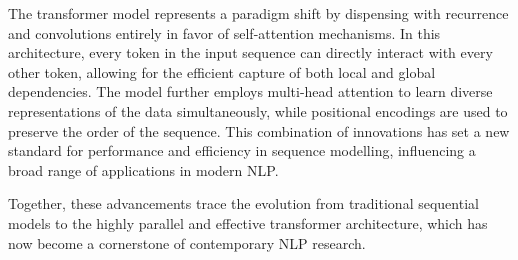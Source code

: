 The transformer model represents a paradigm shift by dispensing with recurrence and convolutions entirely in favor of self-attention mechanisms. In this architecture, every token in the input sequence can directly interact with every other token, allowing for the efficient capture of both local and global dependencies. The model further employs multi-head attention to learn diverse representations of the data simultaneously, while positional encodings are used to preserve the order of the sequence. This combination of innovations has set a new standard for performance and efficiency in sequence modelling, influencing a broad range of applications in modern NLP.

Together, these advancements trace the evolution from traditional sequential models to the highly parallel and effective transformer architecture, which has now become a cornerstone of contemporary NLP research.
